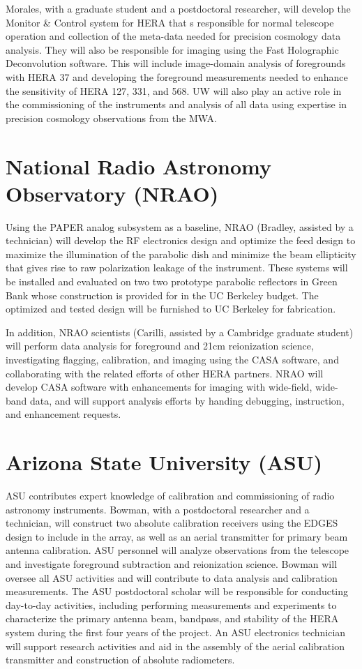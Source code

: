\documentclass[preprint]{aastex}
\begin{document}
Morales, with a graduate student and a postdoctoral researcher,
will develop the Monitor \& Control system
for HERA that s responsible for normal telescope operation and collection of the
meta-data needed for precision cosmology data analysis. They will also be
responsible for imaging using the Fast Holographic Deconvolution software. This
will include image-domain analysis of foregrounds with HERA 37 and developing the foreground
measurements needed to enhance the sensitivity of HERA 127, 331, and 568. UW
will also play an active role in the commissioning of the instruments and
analysis of all data using expertise in precision cosmology observations from the MWA.

\section*{National Radio Astronomy Observatory (NRAO)}

Using the PAPER analog subsystem as a baseline, NRAO (Bradley, assisted by a
technician) will develop the RF electronics design and optimize the feed design
to maximize the illumination of the parabolic dish and minimize the beam
ellipticity that gives rise to raw polarization leakage of the instrument.
These systems will be installed and evaluated on two two prototype parabolic
reflectors in Green Bank whose construction is provided for in the UC Berkeley
budget.  The optimized and tested design will be furnished to UC Berkeley for
fabrication.

In addition, NRAO scientists (Carilli, assisted by a Cambridge graduate
student) will perform data analysis for foreground and 21cm reionization
science, investigating flagging, calibration, and imaging using the CASA
software, and collaborating with the related efforts of other HERA partners.
NRAO will develop CASA software with enhancements for imaging with wide-field,
wide-band data, and will support analysis efforts by handing debugging,
instruction, and enhancement requests.

\section*{Arizona State University (ASU)}

ASU contributes expert knowledge of calibration and commissioning of radio
astronomy instruments. Bowman, with a postdoctoral researcher and a
technician, will construct two absolute calibration receivers
using the EDGES design to include in the array, as well as an aerial
transmitter for primary beam antenna calibration. ASU personnel will analyze
observations from the telescope and investigate foreground subtraction and
reionization science.  Bowman will oversee all ASU activities and will
contribute to data analysis and calibration measurements.  The ASU postdoctoral
scholar will be responsible for conducting day-to-day activities, including
performing measurements and experiments to characterize the primary antenna
beam, bandpass, and stability of the HERA system during the first four years of
the project.  An ASU electronics technician will support research activities
and aid in the assembly of the aerial calibration transmitter and construction
of absolute radiometers.
\end{document}
